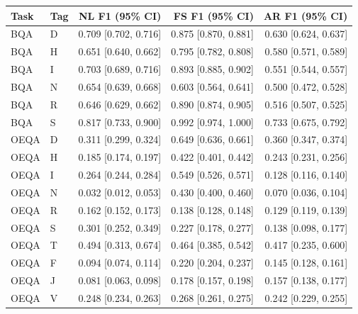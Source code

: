 \begin{tabular}{llrrr}
\toprule
Task & Tag & NL F1 (95\% CI) & FS F1 (95\% CI) & AR F1 (95\% CI) \\
\midrule
BQA & D & 0.709 [0.702, 0.716] & 0.875 [0.870, 0.881] & 0.630 [0.624, 0.637] \\
BQA & H & 0.651 [0.640, 0.662] & 0.795 [0.782, 0.808] & 0.580 [0.571, 0.589] \\
BQA & I & 0.703 [0.689, 0.716] & 0.893 [0.885, 0.902] & 0.551 [0.544, 0.557] \\
BQA & N & 0.654 [0.639, 0.668] & 0.603 [0.564, 0.641] & 0.500 [0.472, 0.528] \\
BQA & R & 0.646 [0.629, 0.662] & 0.890 [0.874, 0.905] & 0.516 [0.507, 0.525] \\
BQA & S & 0.817 [0.733, 0.900] & 0.992 [0.974, 1.000] & 0.733 [0.675, 0.792] \\
OEQA & D & 0.311 [0.299, 0.324] & 0.649 [0.636, 0.661] & 0.360 [0.347, 0.374] \\
OEQA & H & 0.185 [0.174, 0.197] & 0.422 [0.401, 0.442] & 0.243 [0.231, 0.256] \\
OEQA & I & 0.264 [0.244, 0.284] & 0.549 [0.526, 0.571] & 0.128 [0.116, 0.140] \\
OEQA & N & 0.032 [0.012, 0.053] & 0.430 [0.400, 0.460] & 0.070 [0.036, 0.104] \\
OEQA & R & 0.162 [0.152, 0.173] & 0.138 [0.128, 0.148] & 0.129 [0.119, 0.139] \\
OEQA & S & 0.301 [0.252, 0.349] & 0.227 [0.178, 0.277] & 0.138 [0.098, 0.177] \\
OEQA & T & 0.494 [0.313, 0.674] & 0.464 [0.385, 0.542] & 0.417 [0.235, 0.600] \\
OEQA & F & 0.094 [0.074, 0.114] & 0.220 [0.204, 0.237] & 0.145 [0.128, 0.161] \\
OEQA & J & 0.081 [0.063, 0.098] & 0.178 [0.157, 0.198] & 0.157 [0.138, 0.177] \\
OEQA & V & 0.248 [0.234, 0.263] & 0.268 [0.261, 0.275] & 0.242 [0.229, 0.255] \\
\bottomrule
\end{tabular}
